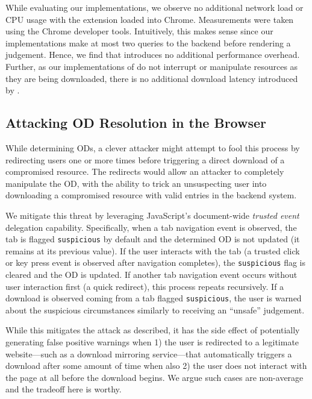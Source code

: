 While evaluating our \SYSTEM{} implementations, we observe no additional
network load or CPU usage with the extension loaded into Chrome.
Measurements were taken using the Chrome developer tools. Intuitively, this
makes sense since our \SYSTEM{} implementations make at most two queries to the
backend before rendering a judgement. Hence, we find that \SYSTEM{} introduces
no additional performance overhead. Further, as our implementations
of \SYSTEM{} do not interrupt or manipulate resources as they are being
downloaded, there is no additional download latency introduced by \SYSTEM{}.

\subsection{Attacking OD Resolution in the Browser}

While determining ODs, a clever attacker might attempt to fool this process by
redirecting users one or more times before triggering a direct download of a
compromised resource. The redirects would allow an attacker to completely
manipulate the OD, with the ability to trick an unsuspecting user into
downloading a compromised resource with valid entries in the backend system.

We mitigate this threat by leveraging JavaScript's document-wide \emph{trusted
event}~\cite{TrustedEvents} delegation capability. Specifically, when a tab
navigation event is observed, the tab is flagged \texttt{suspicious} by default
and the determined OD is not updated (\ie it remains at its previous value). If
the user interacts with the tab (\ie a trusted click or key press event is
observed after navigation completes), the \texttt{suspicious} flag is cleared
and the OD is updated. If another tab navigation event occurs without user
interaction first (\eg a quick redirect), this process repeats recursively. If a
download is observed coming from a tab flagged \texttt{suspicious}, the user is
warned about the suspicious circumstances similarly to receiving an ``unsafe''
judgement.

While this mitigates the attack as described, it has the side effect of
potentially generating false positive warnings when 1) the user is redirected to
a legitimate website---such as a download mirroring service---that automatically
triggers a download after some amount of time when also 2) the user does not
interact with the page at all before the download begins. We argue such cases
are non-average and the tradeoff here is worthy.
